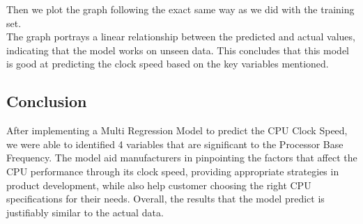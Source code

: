 Then we plot the graph following the exact same way as we did with the training set.\\


The graph portrays a linear relationship between the predicted and actual values, indicating that the model works on unseen data. This concludes that this model is good at predicting the clock speed based on the key variables mentioned.

\subsection{Conclusion}
After implementing a Multi Regression Model to predict the CPU Clock Speed, we were able to identified 4 variables that are significant to the Processor Base Frequency. The model aid manufacturers in pinpointing the factors that affect the CPU performance through its clock speed, providing appropriate strategies in product development, while also help customer choosing the right CPU specifications for their needs. Overall, the results that the model predict is justifiably similar to the actual data. 
\newpage
